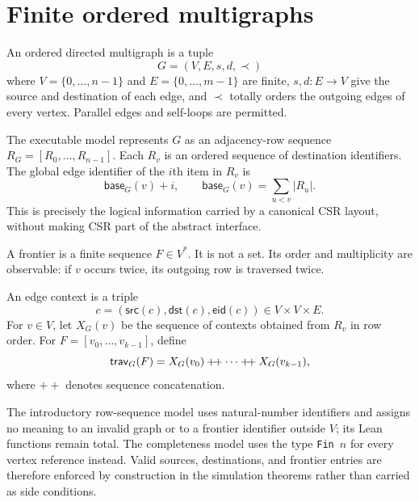 \section{Finite ordered multigraphs}

\begin{definition}
An ordered directed multigraph is a tuple
\[
  G=(V,E,s,d,\prec)
\]
where $V=\{0,\ldots,n-1\}$ and $E=\{0,\ldots,m-1\}$ are finite,
$s,d:E\to V$ give the source and destination of each edge, and $\prec$
totally orders the outgoing edges of every vertex.  Parallel edges and
self-loops are permitted.
\end{definition}

The executable model represents $G$ as an adjacency-row sequence
$R_G=[R_0,\ldots,R_{n-1}]$.  Each $R_v$ is an ordered sequence of destination
identifiers.  The global edge identifier of the $i$th item in $R_v$ is
\[
  \mathsf{base}_G(v)+i,
  \qquad
  \mathsf{base}_G(v)=\sum_{u<v}|R_u|.
\]
This is precisely the logical information carried by a canonical CSR layout,
without making CSR part of the abstract interface.

\begin{definition}[Frontier]
A frontier is a finite sequence $F\in V^*$.  It is not a set.  Its order and
multiplicity are observable: if $v$ occurs twice, its outgoing row is traversed
twice.
\end{definition}

\begin{definition}
An edge context is a triple
\[
  c=(\mathsf{src}(c),\mathsf{dst}(c),\mathsf{eid}(c))\in V\times V\times E.
\]
For $v\in V$, let $X_G(v)$ be the sequence of contexts obtained from $R_v$ in
row order.  For $F=[v_0,\ldots,v_{k-1}]$, define
\[
  \mathsf{trav}_G(F)=X_G(v_0)\mathbin{+\!+}\cdots\mathbin{+\!+}X_G(v_{k-1}),
\]
where $+\!+$ denotes sequence concatenation.
\end{definition}

The introductory row-sequence model uses natural-number identifiers and assigns
no meaning to an invalid graph or to a frontier identifier outside $V$; its
Lean functions remain total.  The completeness model uses the type
\texttt{Fin $n$} for every vertex reference instead.  Valid sources,
destinations, and frontier entries are therefore enforced by construction in
the simulation theorems rather than carried as side conditions.
